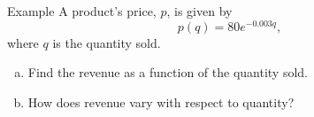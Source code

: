 \documentclass[Lecture.tex]{subfiles}
\begin{document}
\begin{frame}{Example}
  A product's price, $p$, is given by
  $$p(q) = 80e^{-0.003q},$$
  where $q$ is the quantity sold.
  \begin{enumerate}[(a)]
    \item<2-|alert@4-6>
      Find the revenue as a function of the quantity sold.
    \item<3-|alert@7->
      How does revenue vary with respect to quantity?
  \end{enumerate}

\end{frame}
\end{document}
